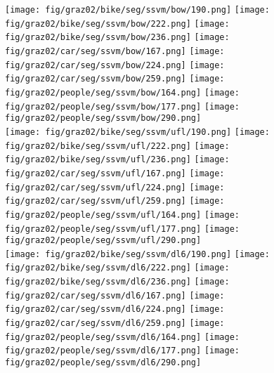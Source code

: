 \documentclass[10pt,3p]{elsarticle}
\begin{document}
\begin{figure}[t]
%
%
%
%
%
%
%
%
%
     
     \texttt{[image: fig/graz02/bike/seg/ssvm/bow/190.png]}
     \texttt{[image: fig/graz02/bike/seg/ssvm/bow/222.png]}
     \texttt{[image: fig/graz02/bike/seg/ssvm/bow/236.png]}       
	\texttt{[image: fig/graz02/car/seg/ssvm/bow/167.png]}                  
    \texttt{[image: fig/graz02/car/seg/ssvm/bow/224.png]}
     \texttt{[image: fig/graz02/car/seg/ssvm/bow/259.png]}  
     \texttt{[image: fig/graz02/people/seg/ssvm/bow/164.png]}   
     \texttt{[image: fig/graz02/people/seg/ssvm/bow/177.png]} 
     \texttt{[image: fig/graz02/people/seg/ssvm/bow/290.png]} \\
     
     \texttt{[image: fig/graz02/bike/seg/ssvm/ufl/190.png]}
     \texttt{[image: fig/graz02/bike/seg/ssvm/ufl/222.png]}
     \texttt{[image: fig/graz02/bike/seg/ssvm/ufl/236.png]}       
	\texttt{[image: fig/graz02/car/seg/ssvm/ufl/167.png]}                  
    \texttt{[image: fig/graz02/car/seg/ssvm/ufl/224.png]}
     \texttt{[image: fig/graz02/car/seg/ssvm/ufl/259.png]}  
     \texttt{[image: fig/graz02/people/seg/ssvm/ufl/164.png]}   
     \texttt{[image: fig/graz02/people/seg/ssvm/ufl/177.png]} 
     \texttt{[image: fig/graz02/people/seg/ssvm/ufl/290.png]} \\
     
     
     \texttt{[image: fig/graz02/bike/seg/ssvm/dl6/190.png]}
     \texttt{[image: fig/graz02/bike/seg/ssvm/dl6/222.png]}
     \texttt{[image: fig/graz02/bike/seg/ssvm/dl6/236.png]}       
	\texttt{[image: fig/graz02/car/seg/ssvm/dl6/167.png]}                  
    \texttt{[image: fig/graz02/car/seg/ssvm/dl6/224.png]}
     \texttt{[image: fig/graz02/car/seg/ssvm/dl6/259.png]}  
     \texttt{[image: fig/graz02/people/seg/ssvm/dl6/164.png]}   
     \texttt{[image: fig/graz02/people/seg/ssvm/dl6/177.png]} 
     \texttt{[image: fig/graz02/people/seg/ssvm/dl6/290.png]} \\


\end{figure}
\end{document}
